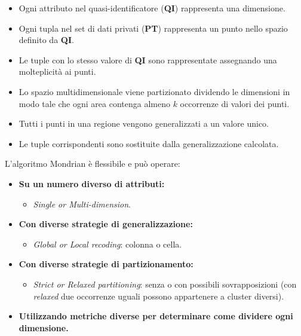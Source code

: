 \documentclass{report}
\begin{document}
\begin{itemize}
    \item Ogni attributo nel quasi-identificatore (\textbf{QI}) rappresenta una dimensione.
    \item Ogni tupla nel set di dati privati (\textbf{PT}) rappresenta un punto nello spazio definito da \textbf{QI}.
    \item Le tuple con lo stesso valore di \textbf{QI} sono rappresentate assegnando una molteplicità ai punti.
    \item Lo spazio multidimensionale viene partizionato dividendo le dimensioni in modo tale che ogni area contenga almeno $k$ occorrenze di valori dei punti. 
    \item Tutti i punti in una regione vengono generalizzati a un valore unico.
    \item Le tuple corrispondenti sono sostituite dalla generalizzazione calcolata.
\end{itemize}

\noindent L'algoritmo Mondrian è flessibile e può operare:
\begin{itemize}
    \item \textbf{Su un numero diverso di attributi:} 
    \begin{itemize}
        \item \textit{Single or Multi-dimension}.
    \end{itemize}
    \item \textbf{Con diverse strategie di generalizzazione:}
    \begin{itemize}
        \item \textit{Global or Local recoding}: colonna o cella.
    \end{itemize}
    \item \textbf{Con diverse strategie di partizionamento:} 
    \begin{itemize}
        \item \textit{Strict or Relaxed partitioning}: senza o con possibili sovrapposizioni (con \textit{relaxed} due occorrenze uguali possono appartenere a cluster diversi).
    \end{itemize}
    \item \textbf{Utilizzando metriche diverse per determinare come dividere ogni dimensione.}
\end{itemize}

\newpage
\end{document}
